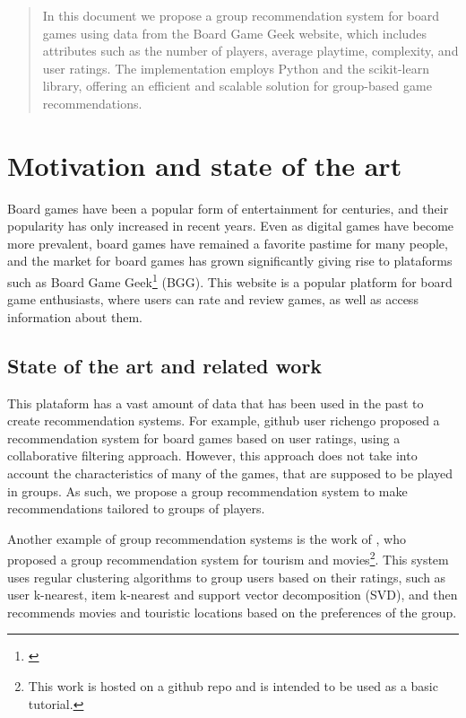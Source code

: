 \documentclass{article}
\begin{document}
\begin{abstract}
    In this document we propose a group recommendation system for board games using data from the Board Game Geek website, which includes attributes such as the number of players, average playtime, complexity, and user ratings.
    The implementation employs Python and the scikit-learn library, offering an efficient and scalable solution for group-based game recommendations.
\end{abstract}

\section{Motivation and state of the art}

Board games have been a popular form of entertainment for centuries, and their popularity has only increased in recent years. Even as digital games have become more prevalent, board games have remained a favorite pastime for many people, and the market for board games has grown significantly giving rise to plataforms such as Board Game Geek\footnote{\cite{boardgamegeek}} (BGG). This website is a popular platform for board game enthusiasts, where users can rate and review games, as well as access information about them.

\subsection{State of the art and related work}

This plataform has a vast amount of data that has been used in the past to create recommendation systems. For example,
github user richengo  proposed a recommendation system for board games based on user ratings, using a collaborative filtering approach. However, this approach does not take into account the characteristics of many of the games, that are supposed to be played in groups. As such, we propose a group recommendation system to make recommendations tailored to groups of players.

Another example of group recommendation systems is the work of \cite{group_recommenders_repo}, who proposed a group recommendation system for tourism and movies\footnote{This work is hosted on a github repo and is intended to be used as a basic tutorial.}.
This system uses regular clustering algorithms to group users based on their ratings, such as user k-nearest, item k-nearest and support vector decomposition (SVD), and then recommends movies and touristic locations based on the preferences of the group.
\end{document}
